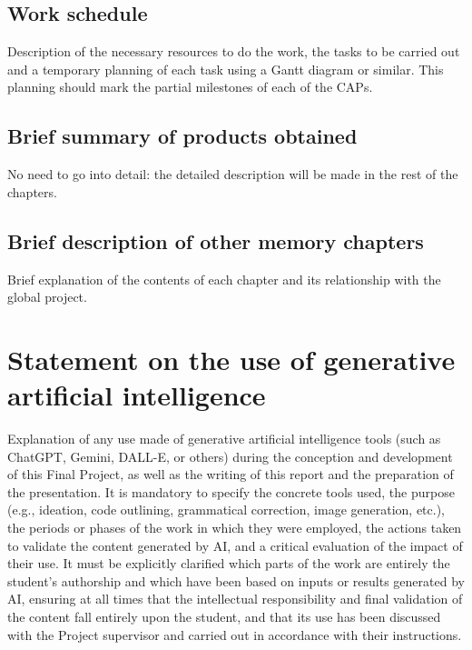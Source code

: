 \documentclass[ENG,BIB]{TFUOC}%
\begin{document}
\section{Work schedule}

Description of the necessary resources to do the work, the tasks to be carried out and a temporary planning of each task using a Gantt diagram or similar. This planning should mark the partial milestones of each of the CAPs.



\section{Brief summary of products obtained}

No need to go into detail: the detailed description will be made in the rest of the chapters.


\section{Brief description of other memory chapters}

Brief explanation of the contents of each chapter and its relationship with the global project.

\chapter{Statement on the use of generative artificial intelligence}

Explanation of any use made of generative artificial intelligence tools (such as ChatGPT, Gemini, DALL-E, or others) during the conception and development of this Final Project, as well as the writing of this report and the preparation of the presentation. It is mandatory to specify the concrete tools used, the purpose (e.g., ideation, code outlining, grammatical correction, image generation, etc.), the periods or phases of the work in which they were employed, the actions taken to validate the content generated by AI, and a critical evaluation of the impact of their use. It must be explicitly clarified which parts of the work are entirely the student's authorship and which have been based on inputs or results generated by AI, ensuring at all times that the intellectual responsibility and final validation of the content fall entirely upon the student, and that its use has been discussed with the Project supervisor and carried out in accordance with their instructions.
\end{document}
